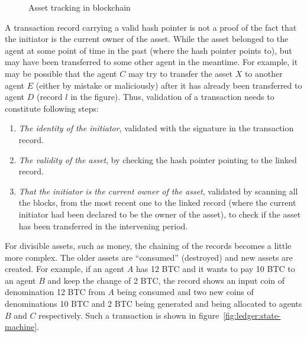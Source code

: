\begin{figure}[!htbp]
	\centerline{
	}
	\caption{Asset tracking in blockchain}
	\label{fig:ledger:records}
\end{figure}

A transaction record carrying a valid hash pointer is not a proof of the fact that the initiator is the current owner of the
asset. While the asset belonged to the agent at some point of time in the past (where the hash pointer points to), but may have 
been transferred to some other agent in the meantime. For example, it may be possible that the agent $C$ may try to transfer the 
asset $X$ to another agent $E$ (either by mistake or maliciously) after it has already been transferred to agent $D$ (record $l$
in the figure). Thus, validation of a transaction needs to constitute following steps:

\begin{enumerate}
	\item {\em The identity of the initiator}, validated with the signature in the transaction record.
	\item {\em The validity of the asset}, by checking the hash pointer pointing to the linked record.
	\item {\em That the initiator is the current owner of the asset}, validated by scanning all the blocks, from
		the most recent one to the linked record (where the current initiator had been declared to 
		be the owner of the asset), to check if the asset has been transferred in the intervening period.
\end{enumerate}

For divisible assets, such as money, the chaining of the records becomes a little more complex. The older assets are ``consumed''
(destroyed) and new assets are created. For example, if an agent $A$ has 12 BTC and it wants to pay 10 BTC to an agent $B$ and 
keep the change of 2 BTC, the record shows an input coin of denomination 12 BTC from $A$ being consumed and two new coins of 
denominations 10 BTC and 2 BTC being generated and being allocated to agents $B$ and $C$ respectively. Such a transaction is 
shown in figure~\ref{fig:ledger:state-machine}.

